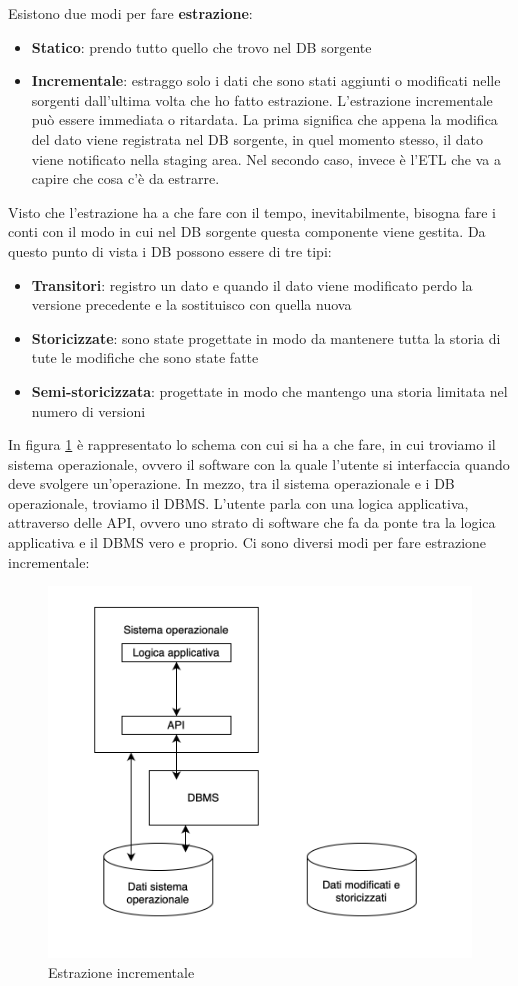 Esistono due modi per fare \textbf{estrazione}:
\begin{itemize}
	\item 
	\textbf{Statico}: prendo tutto quello che trovo nel DB sorgente
	\item 
	\textbf{Incrementale}: estraggo solo i dati che sono stati aggiunti o modificati nelle sorgenti dall’ultima volta che ho fatto estrazione. L’estrazione incrementale può essere immediata o ritardata. La prima significa che appena la modifica del dato viene registrata nel DB sorgente, in quel momento stesso, il dato viene notificato nella staging area. Nel secondo caso, invece è l’ETL che va a capire che cosa c’è da estrarre. 
\end{itemize}
Visto che l’estrazione ha a che fare con il tempo, inevitabilmente, bisogna fare i conti con il modo in cui nel DB sorgente questa componente viene gestita. Da questo punto di vista i DB possono essere di tre tipi:
\begin{itemize}
 \item 
 \textbf{Transitori}: registro un dato e quando il dato viene modificato perdo la versione precedente e la sostituisco con quella nuova
 \item 
 \textbf{Storicizzate}: sono state progettate in modo da mantenere tutta la storia di tute le modifiche che sono state fatte
 \item 
 \textbf{Semi-storicizzata}: progettate in modo che mantengo una storia limitata nel numero di versioni
\end{itemize}
In figura \ref{fig:estrazione} è rappresentato lo schema con cui si ha a che fare, in cui troviamo il sistema operazionale, ovvero il software con la quale l’utente si interfaccia quando deve svolgere un’operazione. In mezzo, tra il sistema operazionale e i DB operazionale, troviamo il DBMS. L’utente parla con una logica applicativa, attraverso delle API, ovvero uno strato di software che fa da ponte tra la logica applicativa e il DBMS vero e proprio. Ci sono diversi modi per fare estrazione incrementale:
\begin{figure}[H]
	\centering
	\includegraphics[width=0.4\linewidth]{img/estrazione}
	\caption{Estrazione incrementale}
	\label{fig:estrazione}
\end{figure}
